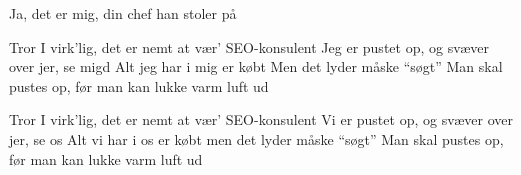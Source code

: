 \documentclass[a4paper,11pt]{article}
\begin{document}
\begin{song}
  
   Ja, det er mig, din chef han stoler på
  
  
   Tror I virk'lig, det er nemt
   at vær' SEO-konsulent
   Jeg er pustet op, og svæver over jer, se migd
   Alt jeg har i mig er købt
   Men det lyder måske ``søgt''
   Man skal pustes op, før man kan lukke varm luft ud
  

   Tror I virk'lig, det er nemt
   at vær’ SEO-konsulent
   Vi er pustet op, og svæver over jer, se os
   Alt vi har i os er købt
   men det lyder måske ``søgt''
   Man skal pustes op, før man kan lukke varm luft ud
\end{song}
\end{document}
